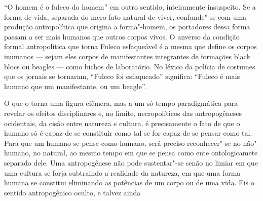 ``O homem é o fuleco do homem'' em outro sentido, inteiramente
insuspeito. Se a forma de vida, separada do mero fato natural de viver,
confunde"-se com uma produção antropolítica que origina a forma"-homem, os
portadores dessa forma passam a ser mais humanos que outros corpos
vivos. O anverso da condição formal antropolítica que torna Fuleco
esfaqueável é a mesma que define os corpos inumanos --- sejam eles corpos
de manifestantes integrantes de formações black blocs ou beagles
--- como bichos de laboratório. No léxico da polícia de costumes que os
jornais se tornaram, ``Fuleco foi esfaqueado'' significa: ``Fuleco é
mais humano que um manifestante, ou um beagle''.

O que o torna uma figura efêmera, mas a um só tempo paradigmática para
revelar os efeitos disciplinares e, no limite, necropolíticos das
antropogêneses ocidentais, da cisão entre natureza e cultura, é
precisamente o fato de que o humano só é capaz de se constituir como tal
se for capaz de se pensar como tal. Para que um humano se pense como
humano, será preciso reconhecer"-se no não"-humano, no natural, ao mesmo
tempo em que se pensa como ente ontologicamete separado dele. Uma
antropogênese não pode sustentar"-se senão no limiar em que uma cultura
se forja subtraindo a realidade da natureza, em que uma forma humana se
constitui eliminando as potências de um corpo ou de uma vida. Eis o
sentido antropogênico oculto, e talvez ainda
